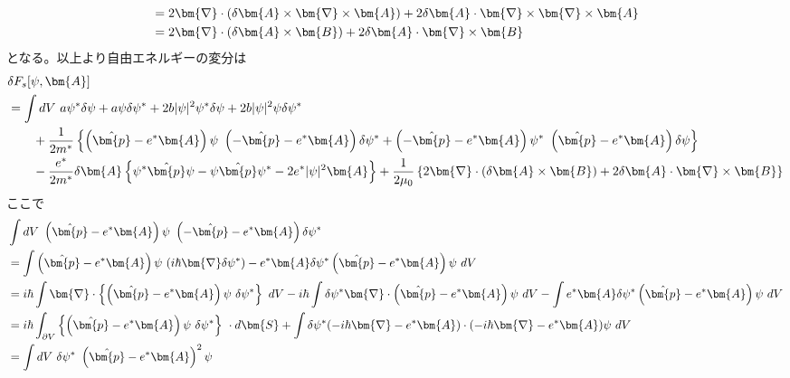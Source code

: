 \documentclass[dvipdfmx, 11pt, a4paper]{jsarticle}
\numberwithin{equation}{section}
\theoremstyle{definition}
\begin{document}
\begin{derivationBox}
        \begin{align}
            &= 2\bm{\nabla} \cdot (\delta \bm{A} \times \bm{\nabla} \times \bm{A}) + 2 \delta \bm{A} \cdot \bm{\nabla} \times \bm{\nabla} \times \bm{A} \notag \\
            &= 2\bm{\nabla} \cdot (\delta \bm{A} \times \bm{B}) +2\delta \bm{A} \cdot \bm{\nabla} \times \bm{B}
        \end{align}
        となる。以上より自由エネルギーの変分は
        \begin{align}
            &\delta F_s[\psi,\bm{A}] \notag \\
            &= \int dV\ a\psi^*\delta \psi  +  a\psi \delta \psi^* + 2b|\psi|^2 \psi^* \delta\psi + 2b|\psi|^2\psi \delta \psi^* \notag \\
            &\ \ \ \ \ \ + \frac{1}{2m^*} \left\{ \left( \hat{\bm{p}} -e^*\bm{A} \right) \psi\ \left( -\hat{\bm{p}} -e^*\bm{A}  \right)  \delta \psi^* + \left( -\hat{\bm{p}} -e^*\bm{A} \right) \psi^*\ \left( \hat{\bm{p}} -e^*\bm{A}  \right)  \delta \psi  \right\}\notag \\
            &\ \ \ \ \ \ -\frac{e^*}{2m^*} \delta \bm{A} \left\{ \psi^*  \hat{\bm{p}}  \psi - \psi \hat{\bm{p}} \psi^* -2e^*|\psi|^2\bm{A} \right\} + \frac{1}{2\mu_0} \left\{ 2\bm{\nabla} \cdot (\delta \bm{A} \times \bm{B}) +2\delta \bm{A} \cdot \bm{\nabla} \times \bm{B} \right\}
        \end{align}
        ここで
        \begin{align}
            &\int dV\ \left( \hat{\bm{p}} -e^*\bm{A} \right) \psi\ \left( -\hat{\bm{p}} -e^*\bm{A}  \right)  \delta \psi^* \notag \\
            &= \int \left( \hat{\bm{p}} -e^*\bm{A} \right) \psi\ (i\hbar \bm{\nabla}  \delta \psi^*) -e^*\bm{A} \delta\psi^*\left( \hat{\bm{p}} -e^*\bm{A} \right) \psi\ dV \notag \\
            &= i\hbar \int \bm{\nabla} \cdot \left\{ \left( \hat{\bm{p}} -e^*\bm{A} \right) \psi\ \delta \psi^* \right\}\ dV- i\hbar \int\delta\psi^* \bm{\nabla} \cdot \left( \hat{\bm{p}} -e^*\bm{A} \right) \psi\ dV  -\int e^*\bm{A} \delta\psi^*\left( \hat{\bm{p}} -e^*\bm{A} \right) \psi\ dV \notag \\
            &= i\hbar \int_{\partial V}  \left\{ \left( \hat{\bm{p}} -e^*\bm{A} \right) \psi\ \delta \psi^* \right\}\ \cdot d\bm{S} + \int \delta \psi^* (-i\hbar \bm{\nabla} - e^* \bm{A}) \cdot (-i\hbar \bm{\nabla} - e^* \bm{A}) \psi \ dV\notag \\
            &=  \int dV\ \delta \psi^*\ \left( \hat{\bm{p}} -e^*\bm{A} \right)^2 \psi

\end{align}
\end{derivationBox}
\end{document}
